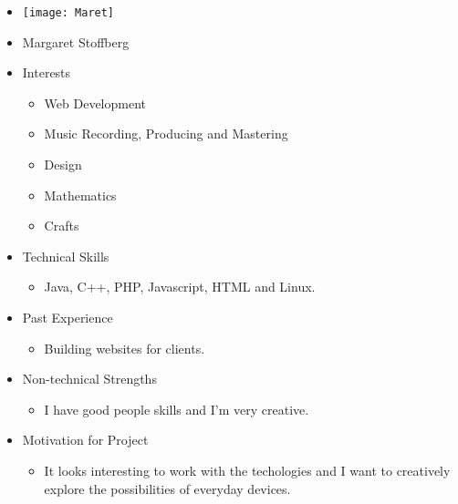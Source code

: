 
\begin{itemize}
	\item[] \texttt{[image: Maret]}
	\item[] Margaret Stoffberg
	\item Interests
	\begin{itemize}
		\item Web Development
		\item Music Recording, Producing and Mastering
		\item Design
		\item Mathematics
		\item Crafts
	\end{itemize}
	\item Technical Skills
	\begin{itemize}
		\item[] Java, C++, PHP, Javascript, HTML and Linux.
	\end{itemize}
	\item Past Experience
	\begin{itemize}
		\item[] Building websites for clients.
	\end{itemize}
	\item Non-technical Strengths
	\begin{itemize}
		\item[] I have good people skills and I'm very creative.
	\end{itemize}
	\item Motivation for Project
	\begin{itemize}
		\item[] It looks interesting to work with the techologies and I want to creatively explore the possibilities of everyday devices.
	\end{itemize}
\end{itemize}

